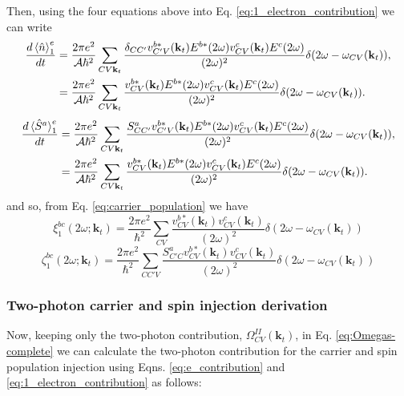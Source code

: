 \documentclass{article}
\newcommand{\kt}{\mathbf{k}_{t}}
\newcommand{\dw}{\delta(2\omega - \omega_{CV}(\kt))}
\begin{document}
Then, using the four equations above into Eq.
\eqref{eq:1_electron_contribution} we can write
\begin{align*}
\frac{d\ev*{\hat{n}}^{e}_{1}}{dt} &= 
\frac{2\pi e^{2}}{\mathcal{A}\hbar^{2}} \sum_{CV\kt}
\frac{\delta_{CC'}v^{b*}_{C'V}(\kt)E^{b*}(2\omega)v^{c}_{CV}(\kt)
E^{c}(2\omega)}{(2\omega)^{2}} \dw , \\
&= \frac{2\pi e^{2}}{\mathcal{A}\hbar^{2}} \sum_{CV\kt}
\frac{v^{b*}_{CV}(\kt)E^{b*}(2\omega)v^{c}_{CV}(\kt)
E^{c}(2\omega)}{(2\omega)^{2}} \dw .
\end{align*}
\begin{align*}
\frac{d\ev*{\hat{S}^{a}}^{e}_{1}}{dt} &= 
\frac{2\pi e^{2}}{\mathcal{A}\hbar^{2}} \sum_{CV\kt}
\frac{S^{a}_{CC'}v^{b*}_{C'V}(\kt)E^{b*}(2\omega)v^{c}_{CV}(\kt)
E^{c}(2\omega)}{(2\omega)^{2}} \dw , \\
&= \frac{2\pi e^{2}}{\mathcal{A}\hbar^{2}} \sum_{CV\kt}
\frac{v^{b*}_{CV}(\kt)E^{b*}(2\omega)v^{c}_{CV}(\kt)
E^{c}(2\omega)}{(2\omega)^{2}} \dw .
\end{align*}
and so, from Eq. \eqref{eq:carrier_population} we have 
\begin{equation}\label{eq:1_carrier_tensor}
\xi^{bc}_{1}(2\omega;\kt) = \frac{2\pi e^{2}}{\hbar^{2}} 
\sum_{CV} \frac{v^{b*}_{CV}(\kt)v^{c}_{CV}(\kt)}{(2\omega)^{2}} \dw \nonumber
\end{equation}
\begin{equation}\label{eq:1_spin_tensor}
\zeta^{bc}_{1}(2\omega;\kt) = \frac{2\pi e^{2}}{\hbar^{2}} 
\sum_{CC'V} \frac{S^{a}_{C'C}v^{b*}_{CV}(\kt)v^{c}_{CV}(\kt)}{(2\omega)^{2}} \dw \nonumber
\end{equation}

\subsubsection{Two-photon carrier and spin injection derivation}

Now, keeping only the two-photon contribution, $\Omega^{II}_{CV}(\kt)$, in Eq. 
\eqref{eq:Omegas-complete} we can calculate the two-photon contribution for the
carrier and spin population injection using Eqns. \eqref{eq:e_contribution} and
\eqref{eq:1_electron_contribution} as follows:
\end{document}
